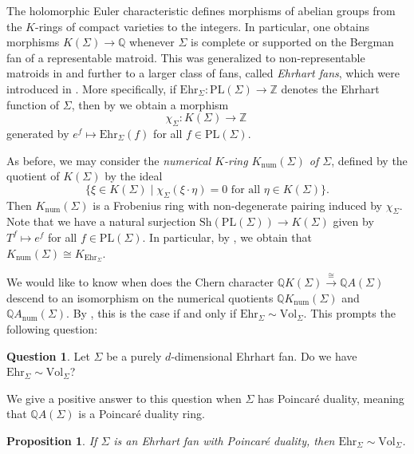 \documentclass[oneside]{amsart}
\theoremstyle{plain}
\newtheorem{proposition}[theorem]{Proposition}
\theoremstyle{definition}
\newtheorem{question}[theorem]{Question}
\newcommand{\Z}{{\mathbb{Z}}}
\newcommand{\Q}{{\mathbb{Q}}}
\newcommand{\Vol}{{\mathrm{Vol}}}
\newcommand{\Ehr}{{\mathrm{Ehr}}}
\newcommand{\Sh}{{\mathrm{Sh}}}
\newcommand{\PL}{{\mathrm{PL}}}
\newcommand{\num}{{\mathrm{num}}}
\begin{document}
The holomorphic Euler characteristic defines morphisms of abelian groups from the $K$-rings of compact varieties to the integers. In particular, one obtains morphisms $K(\Sigma)\to \Q$ whenever $\Sigma$ is complete or supported on the Bergman fan of a representable matroid. This was generalized to non-representable matroids in \cite{LLPP24} and further to a larger class of fans, called \emph{Ehrhart fans}, which were introduced in  \cite{EhrhartFans}. 
More specifically, if $\Ehr_\Sigma: \PL(\Sigma) \to \Z$ denotes the Ehrhart function of $\Sigma$, then by \cite[Corollary 5.20]{EhrhartFans}
we obtain a morphism
\[
    \chi_\Sigma\colon K(\Sigma)\to \Z \ 
\]
generated by $e^f \mapsto \Ehr_\Sigma(f)$ for all $f \in \PL(\Sigma)$.

As before, we may consider the \emph{numerical $K$-ring $K_\num(\Sigma)$ of $\Sigma$}, defined by the quotient of $K(\Sigma)$ by the ideal 
\[
    \{\xi \in K(\Sigma) \mid \chi_\Sigma(\xi \cdot \eta) = 0 \text{ for all } \eta \in K(\Sigma) \}.
\]
Then $K_\num(\Sigma)$ is a Frobenius ring with non-degenerate pairing induced by $\chi_\Sigma$.
Note that we have a natural surjection $\Sh(\PL(\Sigma)) \to K(\Sigma)$ given by $T^f \mapsto e^f$ for all $f \in \PL(\Sigma)$.
In particular, by \Cref{thm:shiftalg}, we obtain that $K_\num(\Sigma) \cong K_{\Ehr_\Sigma}$.

We would like to know when does the Chern character $\Q K(\Sigma) \xrightarrow{\cong} \Q A(\Sigma)$ descend to an isomorphism on the numerical quotients $\Q K_\num(\Sigma)$ and $\Q A_\num(\Sigma)$. By , this is the case if and only if $\Ehr_\Sigma \sim \Vol_\Sigma$. This prompts the following question:

\begin{question}
\label{quest:Ehrhart function same annihilator as volume function?}
Let $\Sigma$ be a purely $d$-dimensional Ehrhart fan. Do we have $\Ehr_\Sigma \sim \Vol_\Sigma$?
\end{question}


We give a positive answer to this question when $\Sigma$ has Poincar\'e duality, meaning that $\Q A(\Sigma)$ is a Poincar\'e duality ring.


\begin{proposition}\label{prop:poincare-ehrhart-hrr}
If $\Sigma$ is an Ehrhart fan with Poincar\'e duality, then $\Ehr_\Sigma \sim \Vol_\Sigma$.
\end{proposition}
\end{document}
